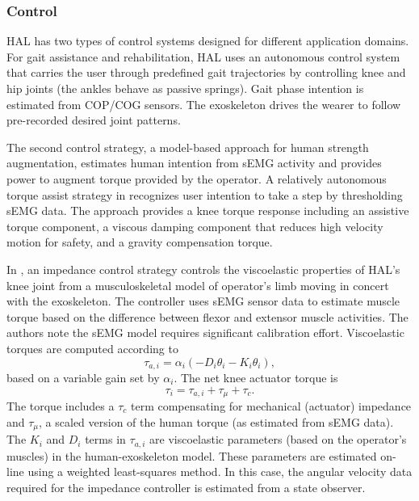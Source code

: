 \begin{refsection}
\subsubsection{Control}

HAL has two types of control systems designed for different application domains.  For gait assistance and rehabilitation, HAL uses an autonomous control system that carries the user through predefined gait trajectories by controlling knee and hip joints (the ankles behave as passive springs).  Gait phase intention is estimated from COP/COG sensors.  The exoskeleton drives the wearer to follow pre-recorded desired joint patterns.

The second control strategy, a model-based approach for human strength augmentation, estimates human intention from sEMG activity and provides power to augment torque provided by the operator.  A relatively autonomous torque assist strategy in \cite{HALmodelControlKnee2010} recognizes user intention to take a step by thresholding sEMG data.  The approach provides a knee torque response including an assistive torque component, a viscous damping component that reduces high velocity motion for safety, and a gravity compensation torque.  

In \cite{HALmuscleImped2005}, an impedance control strategy controls the viscoelastic properties of HAL's knee joint from a musculoskeletal model of operator's limb moving in concert with the exoskeleton.  The controller uses sEMG sensor data to estimate muscle torque based on the difference between flexor and extensor muscle activities.  The authors note the sEMG model requires significant calibration effort.  
Viscoelastic torques are computed according to
\[\tau_{a,i} = \alpha_i(-D_i \theta_i - K_i \theta_i),\]  
based on a variable gain set by $\alpha_i$.  The net knee actuator torque is
\[\tau_i = \tau_{a,i} + \tau_\mu + \tau_c .\]
The torque includes a $\tau_c$ term compensating for mechanical (actuator) impedance and $\tau_\mu$, a scaled version of the human torque (as estimated  from sEMG data).  The $K_i$ and $D_i$ terms in $\tau_{a,i}$ are viscoelastic parameters (based on the operator's muscles) in the human-exoskeleton model.  These parameters are estimated on-line using a weighted least-squares method.  In this case, the angular velocity data required for the impedance controller is estimated from a state observer.


\end{refsection}
